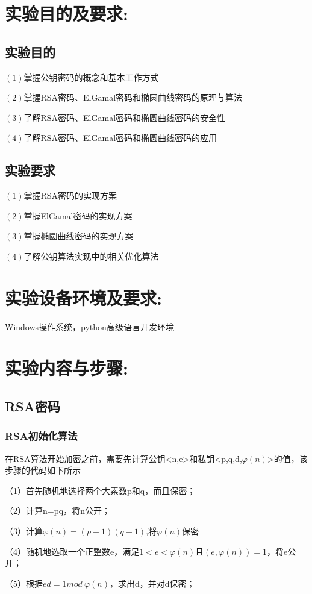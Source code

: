 \documentclass[a4paper,11pt,UTF8]{ctexart}
\begin{document}
\section{实验目的及要求:}
    \subsection{实验目的}
        $(1)$掌握公钥密码的概念和基本工作方式\par
        $(2)$掌握RSA密码、ElGamal密码和椭圆曲线密码的原理与算法\par
        $(3)$了解RSA密码、ElGamal密码和椭圆曲线密码的安全性\par
        $(4)$了解RSA密码、ElGamal密码和椭圆曲线密码的应用\par

    \subsection{实验要求}
        $(1)$掌握RSA密码的实现方案\par
        $(2)$掌握ElGamal密码的实现方案\par
        $(3)$掌握椭圆曲线密码的实现方案\par
        $(4)$了解公钥算法实现中的相关优化算法\par


\section{实验设备环境及要求:}
    Windows操作系统，python高级语言开发环境
\newpage
\section{实验内容与步骤:}
    \subsection{RSA密码}

        \subsubsection{RSA初始化算法}
            在RSA算法开始加密之前，需要先计算公钥<n,e>和私钥<p,q,d,$\varphi (n)$>的值，该步骤的代码如下所示
            
            \par
            （1）首先随机地选择两个大素数p和q，而且保密；\par
            （2）计算n=pq，将n公开；\par
            （3）计算$\varphi (n)=(p-1)(q-1)$,将$\varphi (n)$保密\par
            （4）随机地选取一个正整数e，满足$1<e<\varphi (n)$且$(e,\varphi (n))=1$，将e公开；\par
            （5）根据$ed=1  mod\   \varphi (n)$，求出d，并对d保密；
\end{document}
